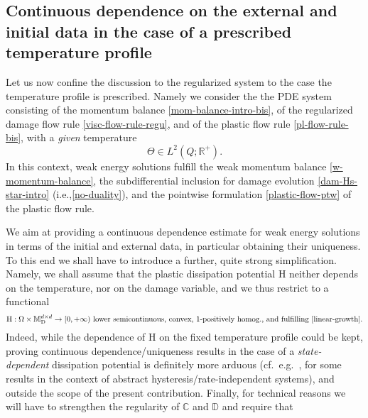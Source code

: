 \documentclass[a4paper,10pt,reqno]{amsart}
\numberwithin{equation}{section}
\newcommand{\bbM}{\mathbb{M}}
\newcommand{\R}{\mathbb{R}}
\numberwithin{equation}{section}
\newcommand{\bbC}{\mathbb{C}}
\newcommand{\bbD}{\mathbb{D}}
\newcommand{\mt}{\bbM}
\newcommand{\dev}{\mathrm{D}}
\newcommand{\dipname}{\mathrm{H}}
\newcommand{\EEE}{\color{black}}
\newcommand{\MMM}{\color{black}}%
\begin{document}
  \subsection{Continuous dependence on the external and initial data \MMM in the case of a prescribed temperature profile\EEE}
  \label{ss:2.5}
  \noindent
Let us now confine the discussion to the regularized system \MMM to the case the temperature profile is prescribed. \EEE %
 Namely we consider the
the PDE system consisting of the momentum balance \eqref{mom-balance-intro-bis},  of the regularized damage flow rule 
\eqref{visc-flow-rule-regu}, and of the plastic flow rule 
\eqref{pl-flow-rule-bis},
 with a \emph{given} temperature %
\begin{equation}
\label{Theta-given}
\Theta \in L^2(Q;\R^+). 
\end{equation}
 In this context, weak energy solutions fulfill the weak momentum balance \eqref{w-momentum-balance},
 the subdifferential inclusion for damage evolution \eqref{dam-Hs-star-intro} (i.e.,\eqref{no-duality}),
  and 
  the pointwise formulation 
 \eqref{plastic-flow-ptw}  of the plastic flow rule. %
 \par
 We aim at providing 
 a continuous dependence estimate for weak energy  solutions  in terms of  the  initial and external  data, in particular obtaining their uniqueness.  
 To this end we shall have to introduce a further, quite strong simplification. Namely,  we shall assume that the plastic dissipation potential $\dipname$ neither depends on the temperature, nor on the damage variable, and we thus restrict to a functional
  \begin{equation}
  \label{H-simpler}
  \dipname: \Omega \times \mt_\dev^{d\times d} \to [0,+\infty) \text{ lower semicontinuous, convex, $1$-positively homog., and fulfilling 
  \eqref{linear-growth}.}
  \end{equation}
  Indeed, while the dependence of $\dipname$ on the fixed temperature profile could be kept, proving continuous dependence/uniqueness results in the case of a \emph{state-dependent} dissipation potential is definitely more arduous (cf.\ e.g.\ \cite{Brokate-Krejci-Schnabel}, 
  \cite{Mielke-Rossi07} for some results in the context of abstract hysteresis/rate-independent systems), and outside the scope of the present contribution. 
  Finally, for technical reasons we will have to strengthen the regularity of $\bbC$  and $\bbD$ and require that 
\end{document}
